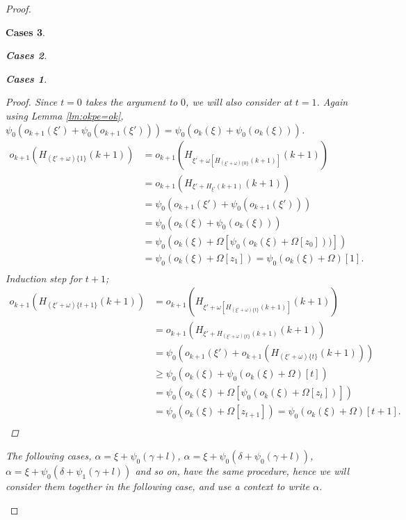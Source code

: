 \documentclass[10pt,a4paper]{amsart}
\newtheorem{Cases}{Cases}
\newcommand{\Om}{{\Omega}}
\newcommand{\al}{{\alpha}}
\newcommand{\de}{\delta}
\newcommand{\ga}{\gamma}
\newcommand{\ok}{o_{k}}
\newcommand{\okpe}{o_{k+1}}
\newcommand{\om}{\omega}
\begin{document}
\begin{proof}
\begin{Cases}
\begin{Cases}
\begin{Cases}
\begin{proof}
                Since $t=0$ takes the argument to $0$, we will also consider at $t=1$.
                Again using  Lemma \ref{lm:okpe=ok}, $ \psi_0(\okpe(\xi') + \psi_0(\okpe(\xi'))) =  \psi_0(\ok(\xi) + \psi_0(\ok(\xi)))$.
                \begin{align*}
                    \okpe(H_{(\xi'+\om)\{1\}} (k+1)) &=\okpe(H_{\xi'+\om[H_{(\xi' + \om)\{0\}}(k+1)]}(k+1)) \\
                    &= \okpe(H_{\xi'+H_{\xi'}(k+1)}(k+1))\\
                    &= \psi_0(\okpe(\xi') + \psi_0(\okpe(\xi')))\\
                    &= \psi_0( \ok(\xi)+ \psi_0(\ok(\xi))) \\
                    &= \psi_0( \ok(\xi)+\Om[\psi_0(\ok(\xi) +\Om[z_0]))]) \\
                    &= \psi_0( \ok(\xi)+ \Om[z_1]) = \psi_0( \ok(\xi)+ \Om)[1].\\
                \end{align*}
                Induction step for $t+1$;
                \begin{align*}
                    \okpe(H_{(\xi'+\om)\{t+1\}} (k+1)) &=\okpe(H_{\xi'+\om[H_{(\xi'+\om)\{t\}}(k+1)]}(k+1)) \\
                    &= \okpe(H_{\xi'+H_{(\xi'+\om)\{t\}}(k+1)}(k+1)) \\
                    &=\psi_0(\okpe(\xi')+ \okpe(H_{(\xi'+\om)\{t\}}(k+1)))\\
                    &\geq \psi_0( \ok(\xi)+\psi_0(\ok(\xi)+ \Om)[t]) \\
                    &= \psi_0( \ok(\xi)+\Om[\psi_0(\ok(\xi)+ \Om[z_t])]) \\
                    &= \psi_0( \ok(\xi)+ \Om[z_{t+1}] ) = \psi_0( \ok(\xi)+ \Om)[t+1].\\
                \end{align*}
            \end{proof}
            
            { \em The following cases, $\al=\xi+\psi_0(\ga+l)$, $\al = \xi+\psi_0(\de+\psi_0(\ga+l))$, $\al= \xi+\psi_0(\de + \psi_1(\ga+l))$ and so on, have the same procedure, hence we will consider them together in the following case, and use a context to write $\al$.} \\
            

\end{Cases}
\end{Cases}
\end{Cases}
\end{proof}
\end{document}
